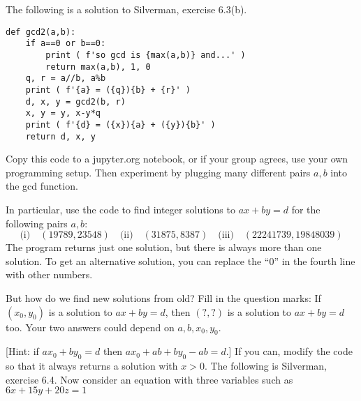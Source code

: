 \documentclass[12pt]{exam}
\begin{document}
\begin{questions}
  \question The following is a solution to Silverman, exercise 6.3(b).
  \begin{lstlisting}
def gcd2(a,b):
    if a==0 or b==0:
        print ( f'so gcd is {max(a,b)} and...' )
        return max(a,b), 1, 0
    q, r = a//b, a%b
    print ( f'{a} = ({q}){b} + {r}' )
    d, x, y = gcd2(b, r)
    x, y = y, x-y*q
    print ( f'{d} = ({x}){a} + ({y}){b}' )
    return d, x, y
  \end{lstlisting}
  Copy this code to a jupyter.org notebook, or if your group agrees, use your own programming setup. Then experiment by plugging many different pairs $a,b$ into the gcd function.

  In particular, use the code to find integer solutions to $ax+by=d$ for the following pairs $a,b$:
  \[\text{(i)}\quad(19789, 23548)\quad
  \text{(ii)}\quad(31875, 8387)\quad
  \text{(iii)}\quad(22241739, 19848039)
    \]
  \vspace{.75in}
  \question The program returns just one solution, but there is always more than one solution. To get an alternative solution, you can replace the ``$0$'' in the fourth line with other numbers.
  
   But how do we find new solutions from old? Fill in the question marks: If $(x_0,y_0)$ is a solution to $ax+by=d$, then $(?,?)$ is a solution to $ax+by=d$ too. Your two answers could depend on $a,b,x_0,y_0$.

  [Hint: if $ax_0+by_0=d$ then $ax_0+ab+by_0-ab=d$.]
  \vspace{\fill}
  \question If you can, modify the code so that it always returns a solution with $x>0$.
  \newpage
  \question The following is Silverman, exercise 6.4. Now consider an equation with three variables such as $6x+15y+20z=1$
\end{questions}
\end{document}
